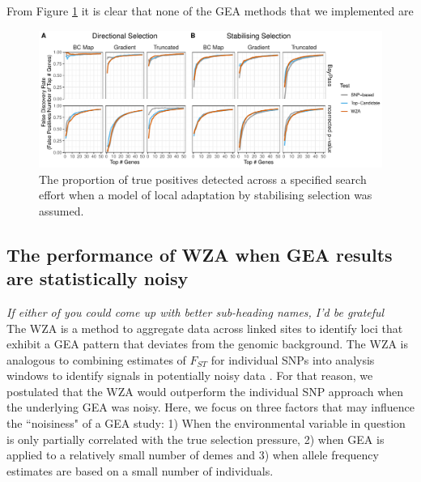 \documentclass[10pt,twoside,lineno, twocolumn]{GSA_format}
\begin{document}
From Figure \ref{fig:falseDiscovery} it is clear that none of the GEA methods that we implemented are 


\begin{figure}
  \includegraphics[width=0.6\linewidth]{Plots/UncorrectedBayPassComparison_FalsePositives.pdf} 
  \caption{The proportion of true positives detected across a specified search effort when a model of local adaptation  by stabilising selection was assumed.}

  \label{fig:falseDiscovery}
\end{figure}



\subsection{The performance of WZA when GEA results are statistically noisy}
\textit{If either of you could come up with better sub-heading names, I'd be grateful}\\


The WZA is a method to aggregate data across linked sites to identify loci that exhibit a GEA pattern that deviates from the genomic background. The WZA is analogous to combining estimates of $F_{ST}$ for individual SNPs into analysis windows to identify signals in potentially noisy data \citep{Hoban2016}. For that reason, we postulated that the WZA would outperform the individual SNP approach when the underlying GEA was noisy. Here, we focus on three factors that may influence the ``noisiness" of a GEA study: 1) When the environmental variable in question is only partially correlated with the true selection pressure, 2) when GEA is applied to a relatively small number of demes and 3) when allele frequency estimates are based on a small number of individuals. \\
\end{document}
